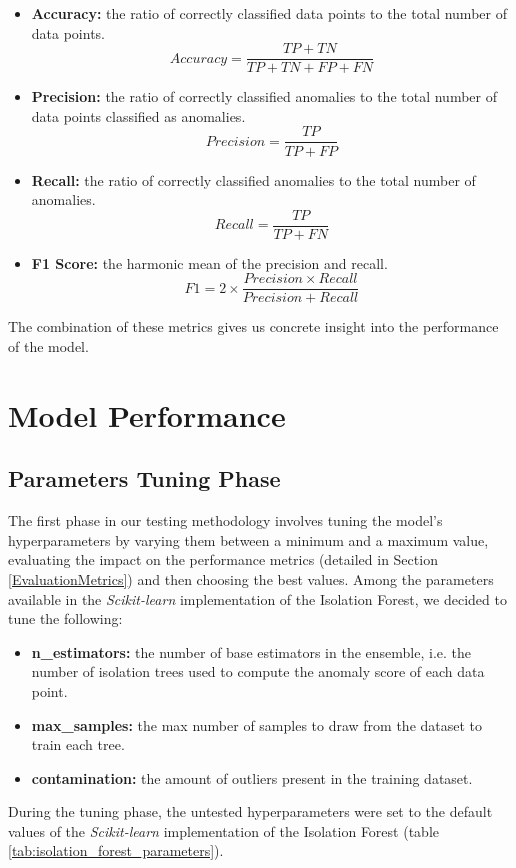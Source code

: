 \documentclass[futureinternet,article,submit,pdftex,moreauthors]{Definitions/mdpi}
\begin{document}
\begin{itemize}
	\item \textbf{Accuracy:} the ratio of correctly classified data points to the total number of data points.
	\begin{equation}
		\label{eq:accuracy}
	  Accuracy = \frac{TP + TN}{TP + TN + FP + FN}
	\end{equation}
	\item \textbf{Precision:} the ratio of correctly classified anomalies to the total number of data points classified as anomalies.
	\begin{equation}
		\label{eq:precision}
	  Precision = \frac{TP}{TP + FP}
	\end{equation}
	\item \textbf{Recall:} the ratio of correctly classified anomalies to the total number of anomalies.
	\begin{equation}
		\label{eq:recall}
	  Recall = \frac{TP}{TP + FN}
	\end{equation}
	\item \textbf{F1 Score:} the harmonic mean of the precision and recall.
	\begin{equation}
		\label{eq:f1}
	  F1 = 2 \times \frac{Precision \times Recall}{Precision + Recall}
	\end{equation}
\end{itemize}
The combination of these metrics gives us concrete insight into the performance of the model. 

\section{Model Performance }

\subsection{Parameters Tuning Phase}

The first phase in our testing methodology involves tuning the model's hyperparameters by varying them between a minimum and a maximum value, evaluating the impact on the performance metrics (detailed in Section \ref{EvaluationMetrics}) and then choosing the best values.
Among the parameters available in the \textit{Scikit-learn} implementation of the Isolation Forest, we decided to tune the following: 

\begin{itemize}
	\item \textbf{n\_estimators:} the number of base estimators in the ensemble, i.e. the number of isolation trees used to compute the anomaly score of each data point. 
	\item \textbf{max\_samples:} the max number of samples to draw from the dataset to train each tree.
	\item \textbf{contamination:} the amount of outliers present in the training dataset.  
\end{itemize} 
During the tuning phase, the untested hyperparameters were set to the default values of the \textit{Scikit-learn} implementation of the Isolation Forest (table \ref{tab:isolation_forest_parameters}).
\end{document}
